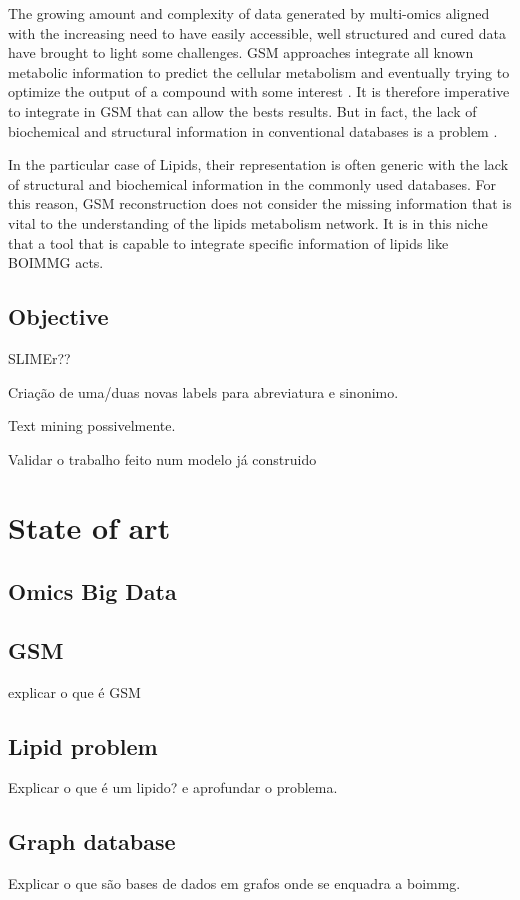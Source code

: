 \documentclass{llncs}
\begin{document}
The growing amount and complexity of data generated by multi-omics aligned with the increasing need to have easily accessible, 
well structured and cured data have brought to light some challenges. GSM approaches integrate all known metabolic information to predict the cellular metabolism and eventually 
trying to optimize the output of a compound with some interest \cite{article3,article5}. It is therefore imperative to integrate in GSM  that can allow the bests results.
But in fact, the lack of biochemical and structural information in conventional databases is a problem \cite{article5}. 

In the particular case of Lipids, their representation is often generic with the lack of structural and biochemical 
information in the commonly used databases\cite{article6}. For this reason, GSM reconstruction does not consider the missing information that is vital to the understanding of the lipids metabolism network.
It is in this niche that a tool that is capable to integrate specific information of lipids like BOIMMG acts.




\subsection{Objective}
SLIMEr??

Criação de uma/duas novas labels para abreviatura e sinonimo.

Text mining possivelmente.

Validar o trabalho feito num modelo já construido
\section{State of art}
\subsection{Omics Big Data}


\subsection{GSM}
explicar o que é GSM
\subsection{Lipid problem}
Explicar o que é um lipido? e aprofundar o problema.
\subsection{Graph database}
Explicar o que são bases de dados em grafos onde se enquadra a boimmg.
\end{document}
